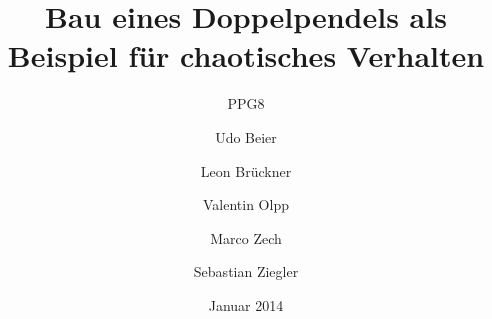 
%
%


\title{Bau eines Doppelpendels als Beispiel für chaotisches Verhalten}
\subtitle{PPG8}
\date{Januar 2014}
\author{Udo Beier \and Leon Brückner \and Valentin Olpp \and Marco Zech \and Sebastian Ziegler}
\maketitle
\tableofcontents
\newpage
\listoffigures
\listoftables
\newpage






\newpage
%
%


